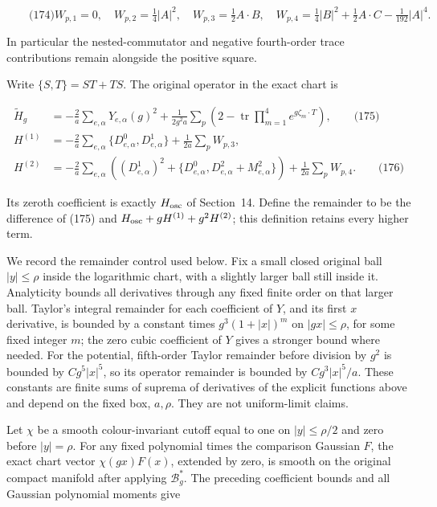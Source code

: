 \[
\qquad\text{(174)}
 W_{p,1}=0,\quad W_{p,2}=\tfrac14|A|^2,\quad
 W_{p,3}=\tfrac12 A\cdot B,\quad
 W_{p,4}=\tfrac14|B|^2+\tfrac12 A\cdot C-\tfrac1{192}|A|^4.
\]

In particular the nested-commutator and negative fourth-order trace
contributions remain alongside the positive square.

Write \(\{S,T\}=ST+TS\). The original operator in the exact chart is

\[
\begin{aligned}
 \widetilde H_g&=-\frac2a\sum_{e,\alpha}Y_{e,\alpha}(g)^2
       +\frac1{2g^2a}\sum_p
                      \left(2-\operatorname{tr}\prod_{m=1}^4e^{g\zeta_m\cdot T}\right),
       \qquad\text{(175)}\\
 H^{(1)}&=-\frac2a\sum_{e,\alpha}\{D^0_{e,\alpha},D^1_{e,\alpha}\}
                           +\frac1{2a}\sum_pW_{p,3},\\
 H^{(2)}&=-\frac2a\sum_{e,\alpha}
       \left((D^1_{e,\alpha})^2+
             \{D^0_{e,\alpha},D^2_{e,\alpha}+M^2_{e,\alpha}\}\right)
                           +\frac1{2a}\sum_pW_{p,4}.
       \qquad\text{(176)}
\end{aligned}
\]

Its zeroth coefficient is exactly \(H_{\rm osc}\) of Section~14. Define
the remainder to be the difference of (175) and
\(H_{\rm osc}+gH^{(1)}+g^2H^{(2)}\); this definition retains every
higher term.

We record the remainder control used below. Fix a small closed original
ball \(|y|\le\rho\) inside the logarithmic chart, with a slightly larger
ball still inside it. Analyticity bounds all derivatives through any
fixed finite order on that larger ball. Taylor's integral remainder for
each coefficient of \(Y\), and its first \(x\) derivative, is bounded by
a constant times \(g^3(1+|x|)^m\) on \(|gx|\le\rho\), for some fixed
integer \(m\); the zero cubic coefficient of \(Y\) gives a stronger
bound where needed. For the potential, fifth-order Taylor remainder
before division by \(g^2\) is bounded by \(C g^5|x|^5\), so its operator
remainder is bounded by \(C g^3|x|^5/a\). These constants are finite
sums of suprema of derivatives of the explicit functions above and
depend on the fixed box, \(a,\rho\). They are not uniform-limit claims.

Let \(\chi\) be a smooth colour-invariant cutoff equal to one on
\(|y|\le\rho/2\) and zero before \(|y|=\rho\). For any fixed polynomial
times the comparison Gaussian \(F\), the exact chart vector
\(\chi(gx)F(x)\), extended by zero, is smooth on the original compact
manifold after applying \(\mathcal B_g^*\). The preceding coefficient
bounds and all Gaussian polynomial moments give

